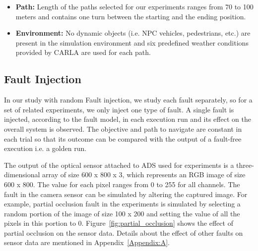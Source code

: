 \begin{itemize}
	\item \textbf{Path:} Length of the paths selected for our experiments ranges from 70 to 100 meters and contains one turn between the starting and the ending position. 
	
	\smallskip
	
	\item \textbf{Environment:} No dynamic objects (i.e. NPC vehicles, pedestrians, etc.) are present in the simulation environment and six predefined weather conditions provided by CARLA are used for each path. 
\end{itemize}

 \subsection{Fault Injection} \label{fi_m}
 
 In our study with random Fault injection, we study each fault separately, so for a set of related experiments, we only inject one type of fault. A single fault is injected, according to the fault model, in each execution run and its effect on the overall system is observed. The objective and path to navigate are constant in each trial so that its outcome can be compared with the output of a fault-free execution i.e. a golden run.

The output of the optical sensor attached to ADS used for experiments is a three-dimensional array of size 600 x 800 x 3, which represents an RGB image of size 600 x 800. The value for each pixel ranges from 0 to 255 for all channels. The fault in the camera sensor can be simulated by altering the captured image. For example, partial occlusion fault in the experiments is simulated by selecting a random portion of the image of size 100 x 200 and setting the value of all the pixels in this portion to 0. Figure~\ref{fig:partial_occlusion} shows the effect of partial occlusion on the sensor data. Details about the effect of other faults on sensor data are mentioned in Appendix~\ref{Appendix:A}.
 
